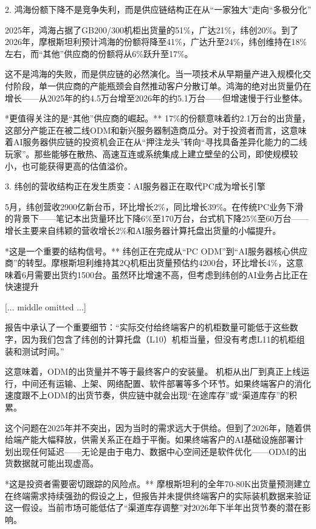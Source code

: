 \documentclass[11pt]{ctexart}
\begin{document}
2. 鸿海份额下降不是竞争失利，而是供应链结构正在从“一家独大”走向“多极分化”

2025年，鸿海占据了GB200/300机柜出货量的51\%，广达21\%，纬创20\%。到了2026年，摩根斯坦利预计鸿海的份额将降至41\%，广达升至24\%，纬创维持在18\%左右，而“其他”供应商的份额将从6\%跃升至17\%。

这不是鸿海的失败，而是供应链的必然演化。当一项技术从早期量产进入规模化交付阶段，单一供应商的产能瓶颈会自然推动客户分散订单。鸿海的绝对出货量仍在增长——从2025年的约4.5万台增至2026年的约5.1万台——但增速慢于行业整体。

*更值得关注的是“其他”供应商的崛起。** 17\%的份额意味着约2.1万台的出货量，这部分产能正在被二线ODM和新兴服务器制造商瓜分。对于投资者而言，这意味着AI服务器供应链的投资机会正在从“押注龙头”转向“寻找具备差异化能力的二线玩家”。那些能够在散热、高速互连或系统集成上建立壁垒的公司，即使规模较小，也可能获得更高的估值溢价。

3. 纬创的营收结构正在发生质变：AI服务器正在取代PC成为增长引擎

5月，纬创营收2900亿新台币，环比增长2\%，同比增长39\%。在传统PC业务下滑的背景下——笔记本出货量环比下降6\%至170万台，台式机下降25\%至60万台——增长主要来自纬颖的营收增长2\%和AI服务器计算托盘出货量的小幅提升。

*这是一个重要的结构信号。** 纬创正在完成从“PC ODM”到“AI服务器核心供应商”的转型。摩根斯坦利维持其2Q机柜出货量预估约4200台，环比增长4\%，这意味着6月需要出货约1500台。虽然环比增速不高，但考虑到纬创的AI业务占比正在快速提升

[... middle omitted ...]

报告中承认了一个重要细节：“实际交付给终端客户的机柜数量可能低于这些数字，因为我们包含了纬创的计算托盘（L10）机柜当量，但没有考虑L11的机柜组装和测试时间。”

这意味着，ODM的出货量并不等于最终客户的安装量。 机柜从出厂到真正上线运行，中间还有运输、上架、网络配置、软件部署等多个环节。如果终端客户的消化速度跟不上ODM的出货节奏，供应链中就会出现“在途库存”或“渠道库存”的积累。

这个问题在2025年并不突出，因为当时的需求远大于供给。但到了2026年，随着供给端产能大幅释放，供需关系正在趋于平衡。如果终端客户的AI基础设施部署计划出现任何延迟——无论是由于电力、数据中心空间还是软件优化——ODM的出货数据就可能出现虚高。

*这是投资者需要密切跟踪的风险点。** 摩根斯坦利的全年70-80K出货量预测建立在终端需求持续强劲的假设之上，但报告并未提供终端客户的实际装机数据来验证这一假设。当前市场可能低估了“渠道库存调整”对2026年下半年出货节奏的潜在影响。
\end{document}
